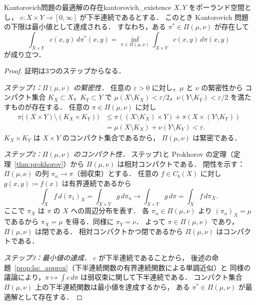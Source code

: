 \documentclass[uplatex, dvipdfmx]{jsarticle}
\begin{document}
\begin{theorem}{Kantorovich問題の最適解の存在}{kantorovich_existence}
$X,Y$ をポーランド空間とし，
$c\colon X\times Y\to[0,\infty]$ が下半連続であるとする．
このとき Kantorovich 問題の下限は最小値として達成される．
すなわち，ある $\pi^*\in\Pi(\mu,\nu)$ が存在して
\[
  \int_{X\times Y} c(x,y)\,d\pi^*(x,y)
  = \inf_{\pi\in\Pi(\mu,\nu)}
    \int_{X\times Y} c(x,y)\,d\pi(x,y)
\]
が成り立つ．
\end{theorem}

\begin{proof}
証明は3つのステップからなる．

\textit{ステップ1：$\Pi(\mu,\nu)$ の緊密性．}
任意の $\varepsilon>0$ に対し，$\mu$ と $\nu$ の緊密性から
コンパクト集合 $K_X\subset X$，$K_Y\subset Y$ で
$\mu(X\setminus K_X)<\varepsilon/2$，$\nu(Y\setminus K_Y)<\varepsilon/2$
を満たすものが存在する．
任意の $\pi\in\Pi(\mu,\nu)$ に対し
\begin{align*}
  \pi\bigl((X\times Y)\setminus(K_X\times K_Y)\bigr)
  &\le \pi((X\setminus K_X)\times Y) + \pi(X\times(Y\setminus K_Y)) \\
  &= \mu(X\setminus K_X) + \nu(Y\setminus K_Y) < \varepsilon.
\end{align*}
$K_X\times K_Y$ は $X\times Y$ のコンパクト集合であるから，
$\Pi(\mu,\nu)$ は緊密である．

\textit{ステップ2：$\Pi(\mu,\nu)$ のコンパクト性．}
ステップ1と Prokhorov の定理（定理~\ref{thm:prokhorov}）から
$\Pi(\mu,\nu)$ は相対コンパクトである．
閉性を示す：$\Pi(\mu,\nu)$ の列 $\pi_n\to\pi$（弱収束）とする．
任意の $f\in C_b(X)$ に対し $g(x,y)\coloneqq f(x)$ は有界連続であるから
\[
  \int_X f\,d(\pi_1)_X
  = \int_{X\times Y} g\,d\pi_n
  \to \int_{X\times Y} g\,d\pi
  = \int_X f\,d\pi_X.
\]
ここで $\pi_X$ は $\pi$ の $X$ への周辺分布を表す．
各 $\pi_n\in\Pi(\mu,\nu)$ より $(\pi_n)_X=\mu$ であるから
$\pi_X=\mu$ を得る．同様に $\pi_Y=\nu$．
よって $\pi\in\Pi(\mu,\nu)$ であり，$\Pi(\mu,\nu)$ は閉である．
相対コンパクトかつ閉であるから $\Pi(\mu,\nu)$ はコンパクトである．

\textit{ステップ3：最小値の達成．}
$c$ が下半連続であることから，
後述の命題~\ref{prop:lsc_approx}（下半連続関数の有界連続関数による単調近似）と
同様の議論により，$\pi\mapsto\int c\,d\pi$ は弱収束に関して下半連続である．
コンパクト集合 $\Pi(\mu,\nu)$ 上の下半連続関数は最小値を達成するから，
ある $\pi^*\in\Pi(\mu,\nu)$ が最適解として存在する．
\end{proof}

\end{document}
